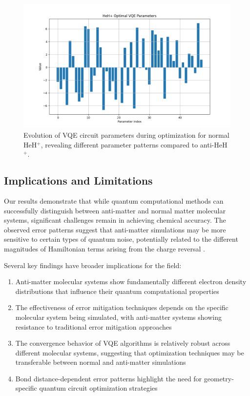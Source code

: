 \documentclass[10pt,twocolumn,a4paper]{article}
\begin{document}
\begin{figure}[t!]
    \centering
    \includegraphics[width=\columnwidth]{graphs/vqe_parameters_heh+.png}
    \caption{Evolution of VQE circuit parameters during optimization for normal HeH$^+$, revealing different parameter patterns compared to anti-HeH$^+$.}
    \label{fig:vqe_parameters_normal}
\end{figure}

\subsection{Implications and Limitations}
Our results demonstrate that while quantum computational methods can successfully distinguish between anti-matter and normal matter molecular systems, significant challenges remain in achieving chemical accuracy. The observed error patterns suggest that anti-matter simulations may be more sensitive to certain types of quantum noise, potentially related to the different magnitudes of Hamiltonian terms arising from the charge reversal \cite{cerezo2021variational}.

Several key findings have broader implications for the field:

\begin{enumerate}
    \item Anti-matter molecular systems show fundamentally different electron density distributions that influence their quantum computational properties
    
    \item The effectiveness of error mitigation techniques depends on the specific molecular system being simulated, with anti-matter systems showing resistance to traditional error mitigation approaches
    
    \item The convergence behavior of VQE algorithms is relatively robust across different molecular systems, suggesting that optimization techniques may be transferable between normal and anti-matter simulations
    
    \item Bond distance-dependent error patterns highlight the need for geometry-specific quantum circuit optimization strategies
\end{enumerate}
\end{document}
